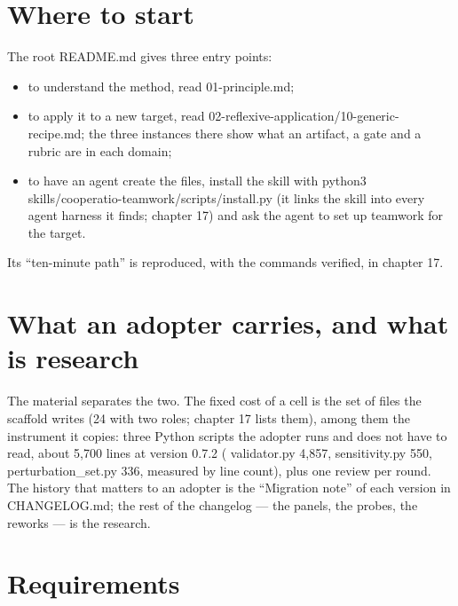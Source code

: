 \documentclass[
  american,
  10pt,
]{report}
\providecommand{\tightlist}{%
  \setlength{\itemsep}{0pt}\setlength{\parskip}{0pt}}
\renewcommand{\texttt}[1]{{\ttfamily\hyphenchar\font=-1 #1}}
\begin{document}
\section{Where to start}\label{where-to-start}

The root \texttt{README.\allowbreak{}md} gives three entry points:

\begin{itemize}
\tightlist
\item
  to understand the method, read
  \texttt{01-\allowbreak{}principle.\allowbreak{}md};
\item
  to apply it to a new target, read
  \texttt{02-\allowbreak{}reflexive-\allowbreak{}application/\allowbreak{}10-\allowbreak{}generic-\allowbreak{}recipe.\allowbreak{}md};
  the three instances there show what an artifact, a gate and a rubric
  are in each domain;
\item
  to have an agent create the files, install the skill with
  \texttt{python3 skills/\allowbreak{}cooperatio-\allowbreak{}teamwork/\allowbreak{}scripts/\allowbreak{}install.\allowbreak{}py}
  (it links the skill into every agent harness it finds; chapter 17) and
  ask the agent to set up teamwork for the target.
\end{itemize}

Its ``ten-minute path'' is reproduced, with the commands verified, in
chapter 17.

\section{What an adopter carries, and what is
research}\label{what-an-adopter-carries-and-what-is-research}

The material separates the two. The fixed cost of a cell is the set of
files the scaffold writes (24 with two roles; chapter 17 lists them),
among them the instrument it copies: three Python scripts the adopter
runs and does not have to read, about 5,700 lines at version 0.7.2
(\texttt{validator.\allowbreak{}py} 4,857,
\texttt{sensitivity.\allowbreak{}py} 550,
\texttt{perturbation\_\allowbreak{}set.\allowbreak{}py} 336, measured by
line count), plus one review per round. The history that matters to an
adopter is the ``Migration note'' of each version in
\texttt{CHANGELOG.\allowbreak{}md}; the rest of the changelog --- the
panels, the probes, the reworks --- is the research.

\section{Requirements}\label{requirements}
\end{document}
